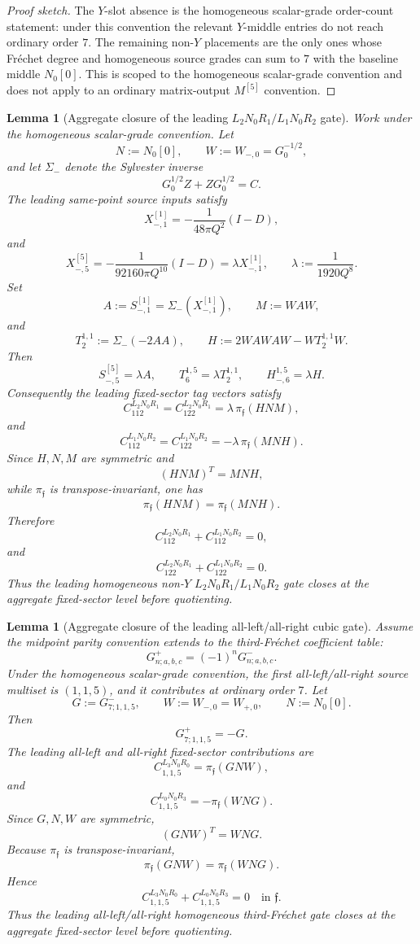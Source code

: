 \documentclass[11pt,a4paper]{amsart}
\theoremstyle{plain}
\newtheorem{lemma}[theorem]{Lemma}
\theoremstyle{definition}
\begin{document}
\begin{proof}[Proof sketch]
The \(Y\)-slot absence is the homogeneous scalar-grade order-count
statement: under this convention the relevant \(Y\)-middle entries do not
reach ordinary order \(7\).  The remaining non-\(Y\) placements are the
only ones whose Fr\'echet degree and homogeneous source grades can sum to
\(7\) with the baseline middle \(N_0[0]\).  This is scoped to the
homogeneous scalar-grade convention and does not apply to an ordinary
matrix-output \(M^{[5]}\) convention.
\end{proof}

\begin{lemma}[Aggregate closure of the leading \(L_2N_0R_1/L_1N_0R_2\) gate]
\label{lem:aggregate-closure-leading-l2n0r1-l1n0r2-gate}
Work under the homogeneous scalar-grade convention.  Let
\[
N:=N_0[0],
\qquad
W:=W_{-,0}=G_0^{-1/2},
\]
and let \(\Sigma_-\) denote the Sylvester inverse
\[
G_0^{1/2}Z+ZG_0^{1/2}=C.
\]
The leading same-point source inputs satisfy
\[
X_{-,1}^{[1]}=-\frac{1}{48\pi Q^2}(I-D),
\]
and
\[
X_{-,5}^{[5]}
=
-\frac{1}{92160\pi Q^{10}}(I-D)
=
\lambda X_{-,1}^{[1]},
\qquad
\lambda:=\frac{1}{1920Q^8}.
\]
Set
\[
A:=S_{-,1}^{[1]}=\Sigma_-(X_{-,1}^{[1]}),
\qquad
M:=WAW,
\]
and
\[
T_2^{1,1}:=\Sigma_-(-2AA),
\qquad
H:=2WAWAW-WT_2^{1,1}W.
\]
Then
\[
S_{-,5}^{[5]}=\lambda A,
\qquad
T_6^{1,5}=\lambda T_2^{1,1},
\qquad
H_{-,6}^{1,5}=\lambda H.
\]
Consequently the leading fixed-sector tag vectors satisfy
\[
C_{112}^{L_2N_0R_1}
=
C_{122}^{L_2N_0R_1}
=
\lambda\,\pi_{\mathfrak f}(HNM),
\]
and
\[
C_{112}^{L_1N_0R_2}
=
C_{122}^{L_1N_0R_2}
=
-\lambda\,\pi_{\mathfrak f}(MNH).
\]
Since \(H,N,M\) are symmetric and
\[
(HNM)^T=MNH,
\]
while \(\pi_{\mathfrak f}\) is transpose-invariant, one has
\[
\pi_{\mathfrak f}(HNM)=\pi_{\mathfrak f}(MNH).
\]
Therefore
\[
C_{112}^{L_2N_0R_1}+C_{112}^{L_1N_0R_2}=0,
\]
and
\[
C_{122}^{L_2N_0R_1}+C_{122}^{L_1N_0R_2}=0.
\]
Thus the leading homogeneous non-\(Y\) \(L_2N_0R_1/L_1N_0R_2\) gate
closes at the aggregate fixed-sector level before quotienting.
\end{lemma}

\begin{lemma}[Aggregate closure of the leading all-left/all-right cubic gate]
\label{lem:aggregate-closure-leading-all-left-all-right-cubic-gate}
Assume the midpoint parity convention extends to the third-Fr\'echet
coefficient table:
\[
G^+_{n;a,b,c}=(-1)^nG^-_{n;a,b,c}.
\]
Under the homogeneous scalar-grade convention, the first
all-left/all-right source multiset is \((1,1,5)\), and it contributes at
ordinary order \(7\).  Let
\[
G:=G^-_{7;1,1,5},
\qquad
W:=W_{-,0}=W_{+,0},
\qquad
N:=N_0[0].
\]
Then
\[
G^+_{7;1,1,5}=-G.
\]
The leading all-left and all-right fixed-sector contributions are
\[
C^{L_3N_0R_0}_{1,1,5}
=
\pi_{\mathfrak f}(GNW),
\]
and
\[
C^{L_0N_0R_3}_{1,1,5}
=
-\pi_{\mathfrak f}(WNG).
\]
Since \(G,N,W\) are symmetric,
\[
(GNW)^T=WNG.
\]
Because \(\pi_{\mathfrak f}\) is transpose-invariant,
\[
\pi_{\mathfrak f}(GNW)=\pi_{\mathfrak f}(WNG).
\]
Hence
\[
C^{L_3N_0R_0}_{1,1,5}
+
C^{L_0N_0R_3}_{1,1,5}
=0
\quad\text{in }\mathfrak f.
\]
Thus the leading all-left/all-right homogeneous third-Fr\'echet gate
closes at the aggregate fixed-sector level before quotienting.
\end{lemma}
\end{document}

